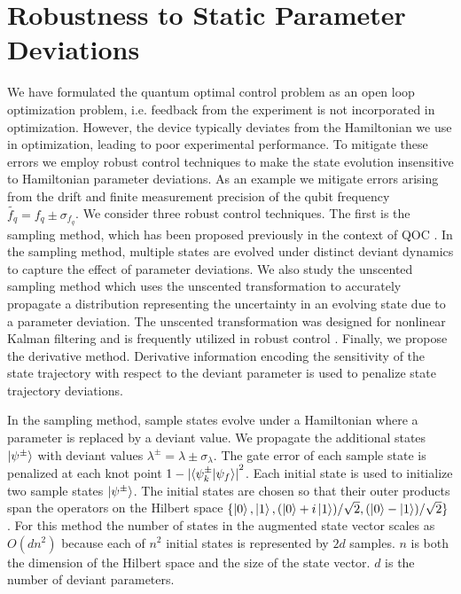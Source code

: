 \documentclass[
  amsfonts,
  amsmath,
  tbtags,
  amssymb,
  aps,
  nobibnotes,
  twocolumn,
  superscriptaddress,
]{revtex4-2}
\begin{document}
\section{Robustness to Static Parameter Deviations}
We have formulated the quantum optimal control
problem as an open loop optimization problem, i.e.
feedback from the experiment is not incorporated in optimization.
However, the device typically deviates from the Hamiltonian we use in optimization,
leading to poor experimental performance. To mitigate
these errors we employ robust control techniques
to make the state evolution insensitive to Hamiltonian
parameter deviations. As an example
we mitigate errors arising from the drift and finite measurement
precision of the qubit frequency $\tilde{f_{q}} = f_{q} \pm \sigma_{f_{q}}$.
We consider three robust control techniques.
The first is the sampling method, which has
been proposed previously in the context of QOC
\cite{rembold2020introduction, reinhold2019controlling, carvalho2020error}. In the
sampling method, multiple states are evolved under distinct deviant dynamics
to capture the effect of parameter deviations. We also
study the unscented sampling method which uses the unscented
transformation to accurately propagate a distribution
representing the uncertainty in an evolving state
due to a parameter deviation.
The unscented transformation was designed for nonlinear Kalman
filtering and is frequently utilized in robust control
\cite{julier2004unscented, lee2013sigma, manchester2016derivative}.
Finally, we propose the derivative method. Derivative
information encoding the sensitivity of the
state trajectory with respect to the deviant parameter
is used to penalize state trajectory deviations.

In the sampling method, sample states evolve under a
Hamiltonian where a parameter is replaced by
a deviant value. We propagate the additional states $\ket{\psi^{\pm}}$ with
deviant values $\lambda^{\pm} = \lambda \pm \sigma_{\lambda}$.
The gate error of each sample state is 
penalized at each knot point
$1 - {\lvert \braket{\psi^{\pm}_{k} | \psi_{f}} \rvert}^{2}$.
Each initial state is used to initialize two
sample states $\ket{\psi^{\pm}}$.
The initial states are chosen so
that their outer products span the operators on the
Hilbert space $\{\ket{0}, \ket{1}, (\ket{0} + i\ket{1}) / \sqrt{2},
(\ket{0} - \ket{1}) / \sqrt{2}\}$ \cite{chow2009randomized}.
For this method the number of states in the augmented state vector
scales as $O(dn^{2})$ because each of $n^{2}$ initial
states is represented by $2d$ samples. $n$ is both the dimension of the Hilbert space
and the size of the state vector. $d$ is the number of deviant parameters.
\end{document}
